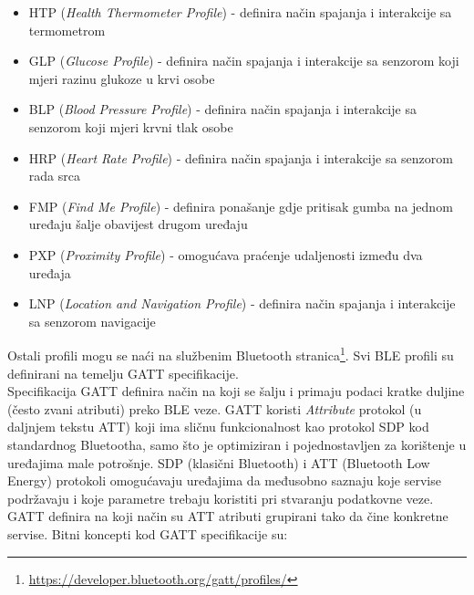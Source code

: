 \begin{itemize}
    \item HTP (\textit{Health Thermometer Profile}) - definira način spajanja i interakcije sa termometrom
    \item GLP (\textit{Glucose Profile}) - definira način spajanja i interakcije sa senzorom koji mjeri razinu glukoze u krvi osobe
    \item BLP (\textit{Blood Pressure Profile}) - definira način spajanja i interakcije sa senzorom koji mjeri krvni tlak osobe
    \item HRP (\textit{Heart Rate Profile}) - definira način spajanja i interakcije sa senzorom rada srca 
    \item FMP (\textit{Find Me Profile}) - definira ponašanje gdje pritisak gumba na jednom uređaju šalje obavijest drugom uređaju
    \item PXP (\textit{Proximity Profile}) - omogućava praćenje udaljenosti između dva uređaja
    \item LNP (\textit{Location and Navigation Profile}) - definira način spajanja i interakcije sa senzorom navigacije
\end{itemize}
Ostali profili mogu se naći na službenim Bluetooth stranica\footnote{\url{https://developer.bluetooth.org/gatt/profiles/}}. Svi BLE profili su definirani na temelju GATT specifikacije.
\\

Specifikacija GATT definira način na koji se šalju i primaju podaci kratke duljine (često zvani atributi) preko BLE veze. 
GATT koristi \textit{Attribute} protokol (u daljnjem tekstu ATT) koji ima sličnu funkcionalnost kao protokol SDP  kod standardnog Bluetootha, samo što je optimiziran i pojednostavljen za korištenje u uređajima male potrošnje. 
SDP (klasični Bluetooth) i ATT (Bluetooth Low Energy) protokoli omogućavaju uređajima da međusobno saznaju koje servise podržavaju i koje parametre trebaju koristiti pri stvaranju podatkovne veze.  
GATT definira na koji način su ATT atributi grupirani tako da čine konkretne servise. 
Bitni koncepti kod GATT specifikacije su:

